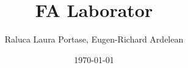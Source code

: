 \documentclass{article}
\begin{document}
\title{FA Laborator}
\author{Raluca Laura Portase, Eugen-Richard Ardelean}
\date{\today}
\maketitle

\tableofcontents
\newpage

\newcommand{\tab}{\hspace*{2em}}
















\newpage
{}
%
%
\end{document}
